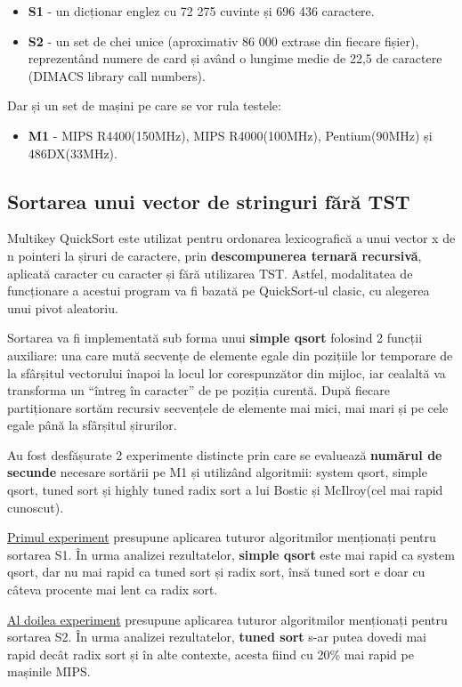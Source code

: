 \documentclass[12pt,a4paper]{article}
\begin{document}
\begin{singlespace}
\begin{itemize}
\item \textbf{S1} - un dicționar englez cu 72 275 cuvinte și 696 436 caractere. 
\item \textbf{S2} - un set de chei unice (aproximativ 86 000 extrase din fiecare fișier), reprezentând numere de card și având o lungime medie de 22,5 de caractere (DIMACS library call numbers).
\end{itemize}

\par
Dar și un set de mașini pe care se vor rula testele:

\begin{itemize}
\item \textbf{M1} - MIPS R4400(150MHz), MIPS R4000(100MHz), Pentium(90MHz) și 486DX(33MHz).
\end{itemize}

\subsection{Sortarea unui vector de stringuri fără TST}
Multikey QuickSort este utilizat pentru ordonarea lexicografică a unui vector x de n pointeri la șiruri de caractere, prin \textbf{descompunerea ternară recursivă}, aplicată caracter cu caracter și fără utilizarea TST. Astfel, modalitatea de funcționare a acestui program va fi bazată pe QuickSort-ul clasic, cu alegerea unui pivot aleatoriu. 
\par
 Sortarea va fi implementată sub forma unui \textbf{simple qsort} folosind 2 funcții auxiliare: una care mută secvențe de elemente egale din pozițiile lor temporare de la sfârșitul vectorului înapoi la locul lor corespunzător din mijloc, iar cealaltă va transforma un “întreg în caracter” de pe poziția curentă. După fiecare partiționare sortăm recursiv secvențele de elemente mai mici, mai mari și pe cele egale până la sfârșitul șirurilor.
 \par
Au fost desfășurate 2 experimente distincte prin care se evaluează \textbf{numărul de secunde} necesare sortării pe M1 și utilizând algoritmii: system qsort, simple qsort, tuned sort și highly tuned radix sort a lui Bostic și McIlroy(cel mai rapid cunoscut).
\par
\underline{Primul experiment} presupune aplicarea tuturor algoritmilor menționați pentru sortarea S1. În urma analizei rezultatelor, \textbf{simple qsort} este mai rapid ca system qsort, dar nu mai rapid ca tuned sort și radix sort, însă tuned sort e doar cu câteva procente mai lent ca radix sort.
\par
\underline{Al doilea experiment} presupune aplicarea tuturor algoritmilor menționați pentru sortarea S2. În urma analizei rezultatelor, \textbf{tuned sort} s-ar putea dovedi mai rapid decât radix sort și în alte contexte, acesta fiind cu 20\% mai rapid pe mașinile MIPS.


\end{singlespace}
\end{document}
